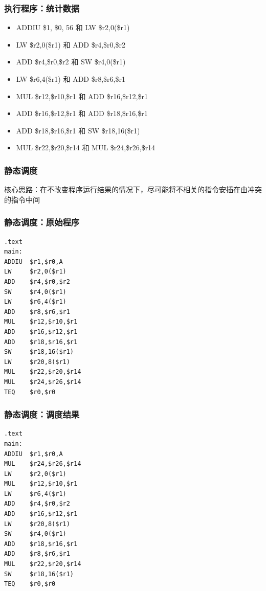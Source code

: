 \documentclass[UTF8]{ctexbeamer}
\begin{document}
\begin{frame}
    \frametitle{执行程序：统计数据}
    \begin{itemize}
        \item ADDIU \$1, \$0, 56 和 LW \$r2,0(\$r1)
        \item LW \$r2,0(\$r1) 和 ADD \$r4,\$r0,\$r2
        \item ADD \$r4,\$r0,\$r2 和 SW \$r4,0(\$r1)
        \item LW \$r6,4(\$r1) 和 ADD \$r8,\$r6,\$r1
        \item MUL \$r12,\$r10,\$r1 和 ADD \$r16,\$r12,\$r1
        \item ADD \$r16,\$r12,\$r1 和 ADD \$r18,\$r16,\$r1
        \item ADD \$r18,\$r16,\$r1 和 SW \$r18,16(\$r1)
        \item MUL \$r22,\$r20,\$r14 和 MUL \$r24,\$r26,\$r14
    \end{itemize}
\end{frame}

\begin{frame}
    \frametitle{静态调度}
    \centering 核心思路：在不改变程序运行结果的情况下，尽可能将不相关的指令安插在由冲突的指令中间
\end{frame}

\begin{frame}[fragile]
    \frametitle{静态调度：原始程序}
    \begin{lstlisting}
.text
main:
ADDIU  $r1,$r0,A
LW     $r2,0($r1)
ADD    $r4,$r0,$r2
SW     $r4,0($r1)
LW     $r6,4($r1)
ADD    $r8,$r6,$r1
MUL    $r12,$r10,$r1
ADD    $r16,$r12,$r1
ADD    $r18,$r16,$r1
SW     $r18,16($r1)
LW     $r20,8($r1)
MUL    $r22,$r20,$r14
MUL    $r24,$r26,$r14
TEQ    $r0,$r0
    \end{lstlisting}
\end{frame}

\begin{frame}[fragile]
    \frametitle{静态调度：调度结果}
    \begin{lstlisting}
.text
main:
ADDIU  $r1,$r0,A
MUL    $r24,$r26,$r14
LW     $r2,0($r1)
MUL    $r12,$r10,$r1
LW     $r6,4($r1)
ADD    $r4,$r0,$r2
ADD    $r16,$r12,$r1
LW     $r20,8($r1)
SW     $r4,0($r1)
ADD    $r18,$r16,$r1
ADD    $r8,$r6,$r1
MUL    $r22,$r20,$r14
SW     $r18,16($r1)
TEQ    $r0,$r0
    \end{lstlisting}
\end{frame}
\end{document}
